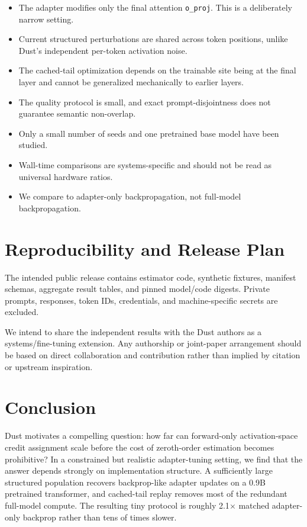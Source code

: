 \documentclass[11pt]{article}
\newcommand{\oproj}{\texttt{o\_proj}}
\begin{document}
\begin{itemize}
    \item The adapter modifies only the final attention \oproj{}. This is a
    deliberately narrow setting.
    \item Current structured perturbations are shared across token positions,
    unlike Dust's independent per-token activation noise.
    \item The cached-tail optimization depends on the trainable site being at
    the final layer and cannot be generalized mechanically to earlier layers.
    \item The quality protocol is small, and exact prompt-disjointness does
    not guarantee semantic non-overlap.
    \item Only a small number of seeds and one pretrained base model have been
    studied.
    \item Wall-time comparisons are systems-specific and should not be read
    as universal hardware ratios.
    \item We compare to adapter-only backpropagation, not full-model
    backpropagation.
\end{itemize}

\section{Reproducibility and Release Plan}

The intended public release contains estimator code, synthetic fixtures,
manifest schemas, aggregate result tables, and pinned model/code digests.
Private prompts, responses, token IDs, credentials, and machine-specific
secrets are excluded.

We intend to share the independent results with the Dust authors as a
systems/fine-tuning extension. Any authorship or joint-paper arrangement
should be based on direct collaboration and contribution rather than implied
by citation or upstream inspiration.

\section{Conclusion}

Dust motivates a compelling question: how far can forward-only
activation-space credit assignment scale before the cost of zeroth-order
estimation becomes prohibitive? In a constrained but realistic adapter-tuning
setting, we find that the answer depends strongly on implementation structure.
A sufficiently large structured population recovers backprop-like adapter
updates on a 0.9B pretrained transformer, and cached-tail replay removes most
of the redundant full-model compute. The resulting tiny protocol is roughly
2.1$\times$ matched adapter-only backprop rather than tens of times slower.
\end{document}
